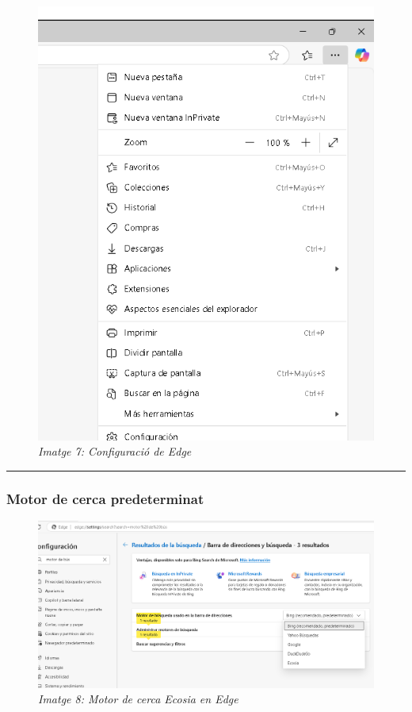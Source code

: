 \documentclass[
  a4paper,
]{article}
\begin{document}
\begin{figure}
\centering
\includegraphics{png/0-EdgeConfiguracio.png}
\caption{\emph{Imatge 7: Configuració de Edge}}
\end{figure}

\begin{center}\rule{0.5\linewidth}{0.5pt}\end{center}

\subsubsection{Motor de cerca
predeterminat}\label{motor-de-cerca-predeterminat-2}

\begin{figure}
\centering
\includegraphics{png/1-EdgeMotor.png}
\caption{\emph{Imatge 8: Motor de cerca Ecosia en Edge}}
\end{figure}
\end{document}
